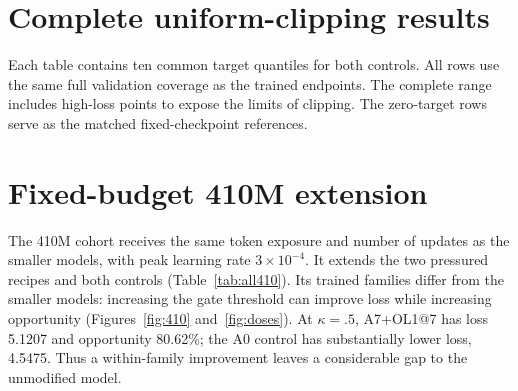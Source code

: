 \begin{table}[h]
\centering
\caption{Difference between seven-site and four-site pressure effects at
14M. Each row compares the two matched pressure contrasts at one threshold.}
\label{tab:response-difference}
\small

\end{table}

\begin{table}[h]
\centering
\caption{Architecture and exposure context. The last two columns use
A7+OL1@7 at $\kappa=.5$. Block share is fixed by the architecture and
full-sequence workload. All conditions use 1.493 billion scheduled tokens.}
\label{tab:architecture}
\small

\end{table}

\clearpage
\section{Complete uniform-clipping results}
\label{app:clipping}
Each table contains ten common target quantiles for both controls.
All rows use the same full validation coverage as the trained endpoints.
The complete range includes high-loss points to expose the limits of
clipping. The zero-target rows serve as the matched fixed-checkpoint
references.

\begin{table}[h]
\centering
\caption{Uniform clipping at 14M. $p$ is the calibration target quantile.}
\small

\end{table}
\begin{table}[h]
\centering
\caption{Uniform clipping at 70M.}
\small

\end{table}
\begin{table}[h]
\centering
\caption{Uniform clipping at 410M.}
\small

\end{table}

\clearpage
\section{Fixed-budget 410M extension}
\label{app:410m}
The 410M cohort receives the same token exposure and number of updates as
the smaller models, with peak learning rate $3\times10^{-4}$.
It extends the two pressured recipes and both controls
(Table~\ref{tab:all410}). Its trained families differ from the smaller
models: increasing the gate threshold can improve loss while increasing
opportunity (Figures~\ref{fig:410} and~\ref{fig:doses}).
At $\kappa=.5$, A7+OL1@7 has loss 5.1207 and opportunity 80.62\%;
the A0 control has substantially lower loss, 4.5475.
Thus a within-family improvement leaves a considerable gap to the
unmodified model.

